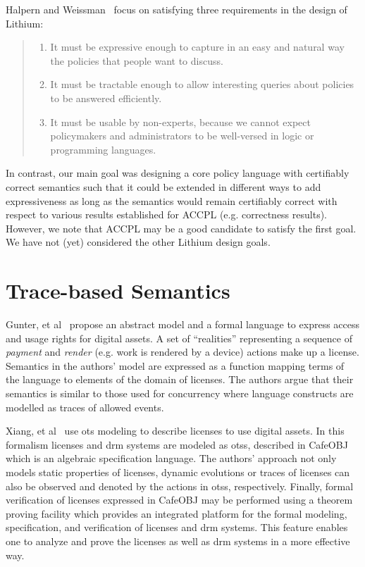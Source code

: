 Halpern and Weissman~\cite{Halpern2008} focus on satisfying three requirements in the design of Lithium:
\begin{quote}
\begin{enumerate}
  \item It must be expressive enough to capture in an easy and natural way the policies that people want to discuss.
  \item It must be tractable enough to allow interesting queries about policies to be answered efficiently.
  \item It must be usable by non-experts, because we cannot expect policymakers and administrators to be well-versed in logic or programming languages.
\end{enumerate}
\end{quote}

In contrast, our main goal was designing a core policy language with certifiably correct semantics such that it could be extended in different ways to add expressiveness as long as the semantics would remain certifiably correct with respect to various results established for \ac{ACCPL} (e.g. correctness results). However, we note that ACCPL may be a good candidate to satisfy the first goal. We have not (yet) considered the other Lithium design goals.


\section{Trace-based Semantics}
Gunter, et al~\cite{GunterWW01} propose an abstract model and a formal language to express access and usage rights for digital assets. A set of ``realities'' representing a sequence of \emph{payment} and \emph{render} (e.g. work is rendered by a device) actions make up a license. Semantics in the authors' model are expressed as a function mapping terms of the language to elements of the domain of licenses. The authors argue that their semantics is similar to those used for concurrency where language constructs are modelled as traces of allowed events.

Xiang, et al~\cite{xiang2008formal} use \ac{ots} modeling to describe licenses to use digital assets. In this formalism licenses and \ac{drm} systems are modeled as \ac{ots}s, described in CafeOBJ~\cite{cafeobj} which is an algebraic specification language. The authors' approach not only models static properties of licenses, dynamic evolutions or traces of licenses can also be observed and denoted by the actions in \ac{ots}s, respectively. Finally, formal verification of licenses expressed in CafeOBJ may be performed using a theorem proving facility which provides an integrated platform for the formal modeling, specification, and verification of licenses and \ac{drm} systems. This feature enables one to analyze and prove the licenses as well as \ac{drm} systems in a more effective way.

